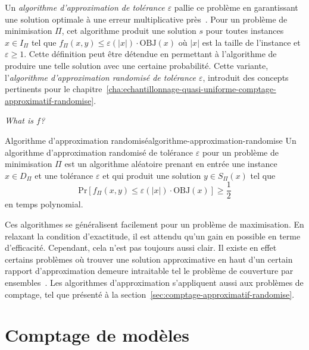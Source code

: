 Un \textit{algorithme d'approximation de tolérance $\varepsilon$} pallie ce problème en garantissant une solution optimale à une erreur multiplicative près~\cite{vaziraniApproximationAlgorithms2003}. Pour un problème de minimisation $\Pi$, cet algorithme produit une solution $s$ pour toutes instances $x \in I_{\Pi}$ tel que $f_{\Pi}(x, y) \leq \varepsilon(\lvert x \rvert ) \cdot \text{OBJ}(x)$ où $\lvert  x \rvert $ est la taille de l'instance et $\varepsilon \geq 1   $. Cette définition peut être détendue en permettant à l'algorithme de produire une telle solution avec une certaine probabilité. Cette variante, l'\textit{algorithme d'approximation randomisé de tolérance $\varepsilon$}, introduit des concepts pertinents pour le chapitre~\ref{cha:echantillonnage-quasi-uniforme-comptage-approximatif-randomise}.

\textcolor{mydarkred}{\textit{What is $f$?}}

\begin{subtheorem}{Algorithme d'approximation randomisé}{algorithme-approximation-randomise}
    Un algorithme d'approximation randomisé de tolérance $\varepsilon$ pour un problème de minimisation $\Pi$ est un algorithme aléatoire prenant en entrée une instance $x \in D_{\Pi}$ et une tolérance $\varepsilon$ et qui produit une solution $y \in S_{\Pi}(x)$ tel que
    \begin{equation*}
        \mathrm{ Pr } [f_{\Pi}(x, y) \leq \varepsilon(\lvert x \rvert ) \cdot \text{OBJ}(x)] \geq \frac{1}{2}
    \end{equation*}
    en temps polynomial.
\end{subtheorem}

Ces algorithmes se généralisent facilement pour un problème de maximisation.
En relaxant la condition d'exactitude, il est attendu qu'un gain en possible en terme d'efficacité. Cependant, cela n'est pas toujours aussi clair. Il existe en effet certains problèmes où trouver une solution approximative en haut d'un certain rapport d'approximation demeure intraitable tel le problème de couverture par ensembles~\cite{lundHardnessApproximatingMinimization1994}. Les algorithmes d'approximation s'appliquent aussi aux problèmes de comptage, tel que présenté à la section~\ref{sec:comptage-approximatif-randomise}.


\section{Comptage de modèles}
\label{sec:complexite-et-bornes-sur-le-comptage}

